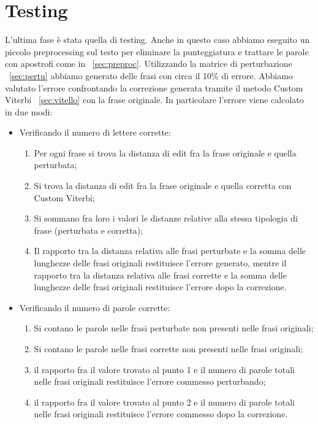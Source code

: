 \section{Testing}
L'ultima fase è stata quella di testing. Anche in questo caso abbiamo eseguito un piccolo preprocessing sul testo per eliminare la punteggiatura e trattare le parole con apostrofi come in  ~\ref{sec:preproc}. Utilizzando la matrice di perturbazione ~\ref{sec:pertu} abbiamo generato delle frasi con circa il 10\% di errore. Abbiamo valutato l'errore confrontando la correzione generata tramite il metodo Custom Viterbi ~\ref{sec:vitello} con la frase originale.   In particolare l'errore viene calcolato in due modi:
\begin{itemize}
\item Verificando il numero di lettere corrette:
\begin{enumerate}
\item Per ogni frase si trova la distanza di edit fra la frase originale e quella perturbata;
\item Si trova la distanza di edit fra la frase originale e quella corretta con Custom Viterbi;
\item Si sommano fra loro i valori le distanze relative alla stessa tipologia di frase (perturbata e corretta);
\item Il rapporto tra la distanza relativa alle frasi perturbate e la somma delle lunghezze delle frasi originali restituisce l'errore generato, mentre il rapporto tra la distanza relativa alle frasi corrette e la somma delle lunghezze delle frasi originali restituisce l'errore dopo la correzione.
\end{enumerate}
\item Verificando il numero di parole corrette:
\begin{enumerate}
\item Si contano le parole nelle frasi perturbate non  presenti  nelle frasi originali;
\item Si contano le parole nelle frasi corrette non presenti nelle frasi originali;
\item il rapporto fra il valore trovato al punto 1 e il numero di parole totali nelle frasi originali restituisce l'errore commesso perturbando;
\item il rapporto fra il valore trovato al punto 2 e il numero di parole totali nelle frasi originali restituisce l'errore commesso dopo la correzione.
\end{enumerate}
\end{itemize}

